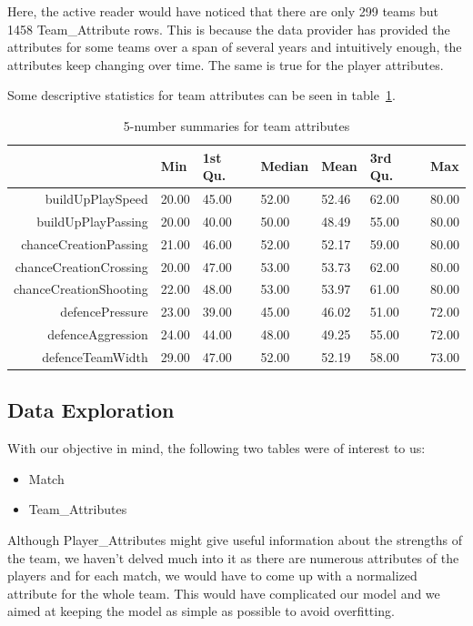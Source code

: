 \documentclass[11pt]{article}
\begin{document}
Here, the active reader would have noticed that there are only 299 teams but 1458 Team\_Attribute rows.
This is because the data provider has provided the attributes for some teams over a span of several years and intuitively enough, the attributes keep changing over time.
The same is true for the player attributes.

Some descriptive statistics for team attributes can be seen in table~\ref{tab:desc-stat}.

\begin{table}[ht]
\centering
\begin{tabular}{rllllll}
  \hline
                 & Min     & 1st Qu. & Median  & Mean    & 3rd Qu. & Max \\
  \hline
buildUpPlaySpeed & 20.00   & 45.00   & 52.00   & 52.46   & 62.00   & 80.00   \\
  buildUpPlayPassing & 20.00   & 40.00   & 50.00   & 48.49   & 55.00   & 80.00   \\
  chanceCreationPassing & 21.00   & 46.00   & 52.00   & 52.17   & 59.00   & 80.00   \\
  chanceCreationCrossing & 20.00   & 47.00   & 53.00   & 53.73   & 62.00   & 80.00   \\
  chanceCreationShooting & 22.00   & 48.00   & 53.00   & 53.97   & 61.00   & 80.00   \\
  defencePressure & 23.00   & 39.00   & 45.00   & 46.02   & 51.00   & 72.00   \\
  defenceAggression & 24.00   & 44.00   & 48.00   & 49.25   & 55.00   & 72.00   \\
  defenceTeamWidth & 29.00   & 47.00   & 52.00   & 52.19   & 58.00   & 73.00   \\
   \hline
\end{tabular}
\caption{5-number summaries for team attributes}
\label{tab:desc-stat}
\end{table}

\subsection{Data Exploration}
With our objective in mind, the following two tables were of interest to us:
\begin{itemize}
  \setlength\itemsep{0em}
  \item Match
  \item Team\_Attributes
\end{itemize}
Although Player\_Attributes might give useful information about the strengths of the team, we haven't delved much into it as there are numerous attributes of the players and for each match, we would have to come up with a normalized attribute for the whole team.
This would have complicated our model and we aimed at keeping the model as simple as possible to avoid overfitting.
\end{document}
